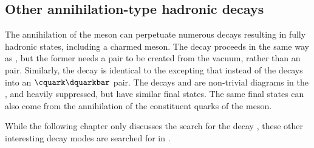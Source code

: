 



\subsection{Other annihilation-type hadronic decays}
The annihilation of the \Bp meson can perpetuate numerous decays resulting in fully hadronic
states, including a charmed meson.
The decay \decay{\Bp}{\Dp\Kstarz} proceeds in the same way as
\btodsphi, but the former needs a \ddbar pair to be created from the \QCD vacuum, rather than an
\ssbar pair.
Similarly, the decay \decay{\Bp}{\Ds\Kstarzb} is identical to the \btodsphi excepting that instead
of \decay{\Wp}{\cquark\squarkbar} the \Wp decays into an $\cquark\dquarkbar$ pair.
The decays \decay{\Bp}{\Dp\Kstarzb} and \decay{\Bp}{\Ds\Kstarz} are non-trivial diagrams in the
\sm, and heavily suppressed, but have similar final states.
The same final states can also come from the annihilation of the constituent
quarks of the \Bc meson.

While the following chapter only discusses the search for the decay \btodsphi, these other
interesting decay modes are searched for in
.

































